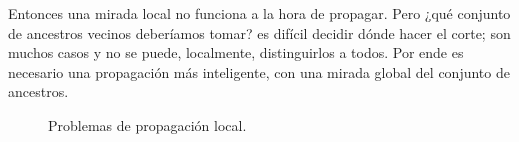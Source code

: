 Entonces una mirada local no funciona a la hora de propagar. Pero ¿qué conjunto de ancestros vecinos deberíamos tomar? es difícil decidir dónde hacer el corte; son muchos casos y no se puede, localmente, distinguirlos a todos. Por ende es necesario una propagación más inteligente, con una mirada global del conjunto de ancestros.
\begin{figure}[htb]
	\centering
	\caption{Problemas de propagación local.}
	\label{fig:propagacionLocal}
\end{figure}

